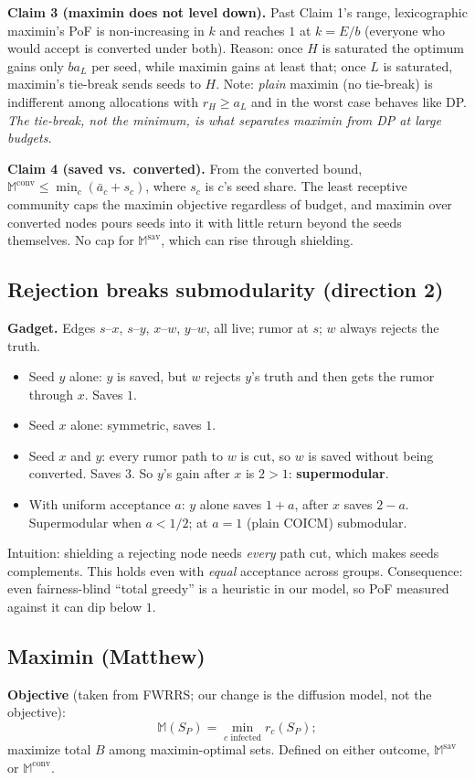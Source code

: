 \documentclass[11pt]{article}
\newcommand{\M}{\mathbb{M}}
\begin{document}
\textbf{Claim 3 (maximin does not level down).} Past Claim 1's range, lexicographic maximin's PoF is non-increasing in $k$ and reaches $1$ at $k=E/b$ (everyone who would accept is converted under both). Reason: once $H$ is saturated the optimum gains only $b a_L$ per seed, while maximin gains at least that; once $L$ is saturated, maximin's tie-break sends seeds to $H$. Note: \emph{plain} maximin (no tie-break) is indifferent among allocations with $r_H\ge a_L$ and in the worst case behaves like DP. \emph{The tie-break, not the minimum, is what separates maximin from DP at large budgets.}

\textbf{Claim 4 (saved vs.\ converted).} From the converted bound, $\M^{\mathrm{conv}}\le\min_c(\bar a_c+s_c)$, where $s_c$ is $c$'s seed share. The least receptive community caps the maximin objective regardless of budget, and maximin over converted nodes pours seeds into it with little return beyond the seeds themselves. No cap for $\M^{\mathrm{sav}}$, which can rise through shielding.

\subsection{Rejection breaks submodularity (direction 2)}
\textbf{Gadget.} Edges $s$--$x$, $s$--$y$, $x$--$w$, $y$--$w$, all live; rumor at $s$; $w$ always rejects the truth.
\begin{itemize}
\item Seed $y$ alone: $y$ is saved, but $w$ rejects $y$'s truth and then gets the rumor through $x$. Saves $1$.
\item Seed $x$ alone: symmetric, saves $1$.
\item Seed $x$ and $y$: every rumor path to $w$ is cut, so $w$ is saved without being converted. Saves $3$. So $y$'s gain after $x$ is $2>1$: \textbf{supermodular}.
\item With uniform acceptance $a$: $y$ alone saves $1+a$, after $x$ saves $2-a$. Supermodular when $a<1/2$; at $a=1$ (plain COICM) submodular.
\end{itemize}
Intuition: shielding a rejecting node needs \emph{every} path cut, which makes seeds complements. This holds even with \emph{equal} acceptance across groups. Consequence: even fairness-blind ``total greedy'' is a heuristic in our model, so PoF measured against it can dip below $1$.

\subsection{Maximin (Matthew)}\label{sec:q2-maximin}
\textbf{Objective} (taken from FWRRS; our change is the diffusion model, not the objective):
\[\M(S_P)=\min_{c\text{ infected}}r_c(S_P);\] maximize total $B$ among maximin-optimal sets. Defined on either outcome, $\M^{\mathrm{sav}}$ or $\M^{\mathrm{conv}}$.
\end{document}
